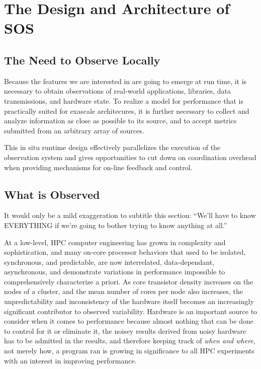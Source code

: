 
\section{The Design and Architecture of SOS}


\subsection{The Need to Observe Locally}

Because the features we are interested in are going to emerge at run
time, it is necessary to obtain observations of real-world
applications, libraries, data transmissions, and hardware state. To
realize a model for performance that is practically suited for
exascale architecures, it is further necessary to collect and analyze
information as close as possible to its source, and to accept metrics
submitted from an arbitrary array of sources.

This in situ runtime design effectively parallelizes the execution of
the observation system and gives opportunities to cut down on
coordination overhead when providing mechanisms for on-line feedback
and control.



\subsection{What is Observed}

It would only be a mild exaggeration to subtitle this section: ``We'll
have to know EVERYTHING if we're going to bother trying to know
anything at all.''

At a low-level, HPC computer engineering has grown in complexity and
sophistication, and many on-core processor behaviors that used to be
isolated, synchronous, and predictable, are now interrelated,
data-dependant, asynchronous, and demonstrate variations in
performance impossible to comprehensively characterize a priori. As
core transistor density increases on the nodes of a cluster, and the
mean number of cores per node also increases, the unpredictability and
inconsistency of the hardware itself becomes an increasingly
significant contributor to observed variability. Hardware is an
important source to consider when it comes to performance because
almost nothing that can be done to control for it or eliminate it, the
noisey results derived from noisy hardware has to be admitted in the
results, and therefore keeping track of \textit{when and where}, not
merely how, a program ran is growing in significance to all HPC experiments
with an interest in improving performance.

